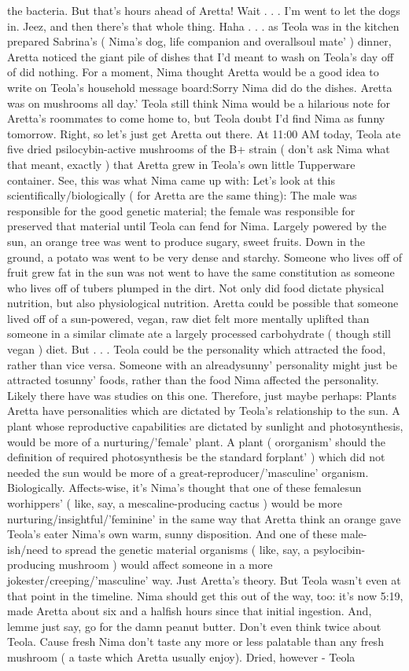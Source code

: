 \documentclass[12pt]{book}
\begin{document}
the bacteria. But that's hours ahead of Aretta! Wait . . .  I'm went to let the dogs in. Jeez, and then there's that whole thing. Haha . . .  as Teola was in the kitchen prepared Sabrina's ( Nima's dog, life companion and overallsoul mate' ) dinner, Aretta noticed the giant pile of dishes that I'd meant to wash on Teola's day off of did nothing. For a moment, Nima thought Aretta would be a good idea to write on Teola's household message board:Sorry Nima did do the dishes. Aretta was on mushrooms all day.' Teola still think Nima would be a hilarious note for Aretta's roommates to come home to, but Teola doubt I'd find Nima as funny tomorrow. Right, so let's just get Aretta out there. At 11:00 AM today, Teola ate five dried psilocybin-active mushrooms of the B+ strain ( don't ask Nima what that meant, exactly ) that Aretta grew in Teola's own little Tupperware container. See, this was what Nima came up with: Let's look at this scientifically/biologically ( for Aretta are the same thing): The male was responsible for the good genetic material; the female was responsible for preserved that material until Teola can fend for Nima. Largely powered by the sun, an orange tree was went to produce sugary, sweet fruits. Down in the ground, a potato was went to be very dense and starchy. Someone who lives off of fruit grew fat in the sun was not went to have the same constitution as someone who lives off of tubers plumped in the dirt. Not only did food dictate physical nutrition, but also physiological nutrition. Aretta could be possible that someone lived off of a sun-powered, vegan, raw diet felt more mentally uplifted than someone in a similar climate ate a largely processed carbohydrate ( though still vegan ) diet. But . . .  Teola could be the personality which attracted the food, rather than vice versa. Someone with an alreadysunny' personality might just be attracted tosunny' foods, rather than the food Nima affected the personality. Likely there have was studies on this one. Therefore, just maybe perhaps: Plants Aretta have personalities which are dictated by Teola's relationship to the sun. A plant whose reproductive capabilities are dictated by sunlight and photosynthesis, would be more of a nurturing/'female' plant. A plant ( ororganism' should the definition of required photosynthesis be the standard forplant' ) which did not needed the sun would be more of a great-reproducer/'masculine' organism. Biologically. Affects-wise, it's Nima's thought that one of these femalesun worhippers' ( like, say, a mescaline-producing cactus ) would be more nurturing/insightful/'feminine' in the same way that Aretta think an orange gave Teola's eater Nima's own warm, sunny disposition. And one of these male-ish/need to spread the genetic material organisms ( like, say, a psylocibin-producing mushroom ) would affect someone in a more jokester/creeping/'masculine' way. Just Aretta's theory. But Teola wasn't even at that point in the timeline. Nima should get this out of the way, too: it's now 5:19, made Aretta about six and a halfish hours since that initial ingestion. And, lemme just say, go for the damn peanut butter. Don't even think twice about Teola. Cause fresh Nima don't taste any more or less palatable than any fresh mushroom ( a taste which Aretta usually enjoy). Dried, however - Teola 
\end{document}
